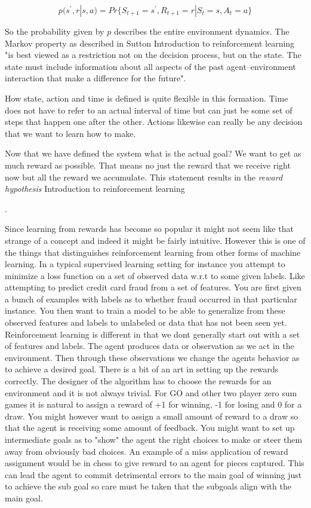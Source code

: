 $$ p(s^{'},r | s, a) = Pr\{S_{t + 1} = s^{'}, R_{t + 1} = r | S_{t} = s, A_{t} = a\}$$

So the probability given by $p$ describes the entire environment dynamics. The Markov property as described in Sutton {Introduction to reinforcement learning} "is best viewed as a restriction not on the decision process, but on the state. The state must include information about all aspects of the past agent–environment interaction that make a difference for the future".

How state, action and time is defined is quite flexible in this formation. Time does not have to refer to an actual interval of time but can just be some set of steps that happen one after the other. Actions likewise can really be any decision that we want to learn how to make. 

Now that we have defined the system what is the actual goal? We want to get as much reward as possible. That means no just the reward that we receive right now but all the reward we accumulate. This statement results in the \textit{reward hypothesis} {Introduction to reinforcement learning}

.

Since learning from rewards has become so popular it might not seem like that strange of a concept and indeed it might be fairly intuitive. However this is one of the things that distinguishes reinforcement learning from other forms of machine learning. In a typical supervised learning setting for instance you attempt to minimize a loss function on a set of observed data w.r.t to some given labels. Like attempting to predict credit card fraud from a set of features. You are first given a bunch of examples with labels as to whether fraud occurred in that particular instance. You then want to train a model to be able to generalize from these observed features and labels to unlabeled or data that has not been seen yet. Reinforcement learning is different in that we dont generally start out with a set of features and labels. The agent produces data or observation as we act in the environment. Then through these observations we change the agents behavior as to achieve a desired goal. There is a bit of an art in setting up the rewards correctly. The designer of the algorithm has to choose the rewards for an environment and it is not always trivial. For GO and other two player zero sum games it is natural to assign a reward of +1 for winning, -1 for losing and 0 for a draw. You might however want to assign a small amount of reward to a draw so that the agent is receiving some amount of feedback. You might want to set up intermediate goals as to "show" the agent the right choices to make or steer them away from obviously bad choices. An example of a miss application of reward assignment would be in chess to give reward to an agent for pieces captured. This can lead the agent to commit detrimental errors to the main goal of winning just to achieve the sub goal so care must be taken that the subgoals align with the main goal. 

